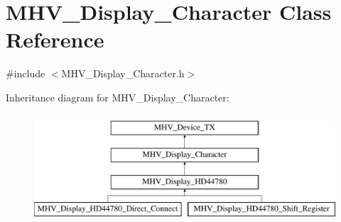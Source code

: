 \hypertarget{class_m_h_v___display___character}{
\section{\-M\-H\-V\-\_\-\-Display\-\_\-\-Character \-Class \-Reference}
\label{class_m_h_v___display___character}
}


{\ttfamily \#include $<$\-M\-H\-V\-\_\-\-Display\-\_\-\-Character.\-h$>$}

\-Inheritance diagram for \-M\-H\-V\-\_\-\-Display\-\_\-\-Character\-:\begin{figure}[H]
\begin{center}
\leavevmode
\includegraphics[height=4.000000cm]{class_m_h_v___display___character}
\end{center}
\end{figure}
